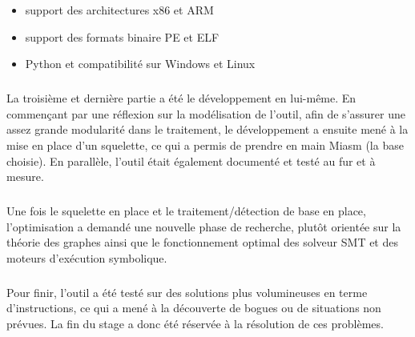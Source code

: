 \begin{itemize}
\item support des architectures x86 et ARM
\item support des formats binaire PE et ELF
\item Python et compatibilité sur Windows et Linux
\end{itemize}
\subparagraph{}
La troisième et dernière partie a été le développement en lui-même. En commençant par une réflexion sur la modélisation de l'outil, afin de s'assurer une assez grande modularité dans le
traitement, le développement a ensuite mené à la mise en place d'un squelette, ce qui a permis de prendre en main Miasm (la base choisie). En parallèle, l'outil était également documenté et testé
au fur et à mesure.
\subparagraph{}
Une fois le squelette en place et le traitement/détection de base en place, l'optimisation a demandé une nouvelle phase de recherche, plutôt orientée sur la théorie des graphes ainsi que le
fonctionnement optimal des solveur SMT et des moteurs d'exécution symbolique.
\subparagraph{}
Pour finir, l'outil a été testé sur des solutions plus volumineuses en terme d'instructions, ce qui a mené à la découverte de bogues ou de situations non prévues. La fin du stage a donc été réservée à la résolution de
ces problèmes.
